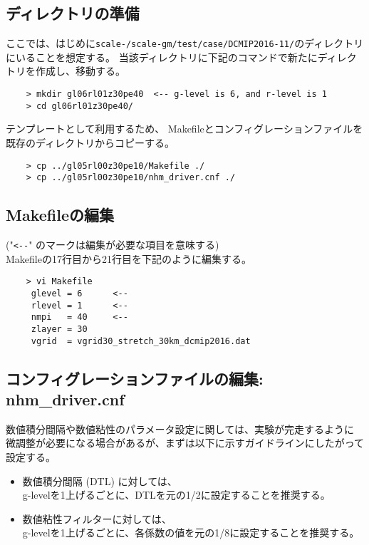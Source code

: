 \subsection{ディレクトリの準備}
 ここでは、はじめに\texttt{scale-{\version}/scale-gm/test/case/DCMIP2016-11/}のディレクトリにいることを想定する。
当該ディレクトリに下記のコマンドで新たにディレクトリを作成し、移動する。
 \begin{verbatim}
    > mkdir gl06rl01z30pe40  <-- g-level is 6, and r-level is 1
    > cd gl06rl01z30pe40/
 \end{verbatim}

 \noindent テンプレートとして利用するため、
  Makefileとコンフィグレーションファイルを既存のディレクトリからコピーする。
 \begin{verbatim}
    > cp ../gl05rl00z30pe10/Makefile ./
    > cp ../gl05rl00z30pe10/nhm_driver.cnf ./
 \end{verbatim}

\subsection{Makefileの編集}
 ("\verb|<--|" のマークは編集が必要な項目を意味する) \\
 Makefileの17行目から21行目を下記のように編集する。
 \begin{verbatim}
    > vi Makefile
     glevel = 6      <--
     rlevel = 1      <--
     nmpi   = 40     <--
     zlayer = 30
     vgrid  = vgrid30_stretch_30km_dcmip2016.dat
 \end{verbatim}

\subsection{コンフィグレーションファイルの編集: nhm\_driver.cnf}
 \noindent 数値積分間隔や数値粘性のパラメータ設定に関しては、実験が完走するように
 微調整が必要になる場合があるが、まずは以下に示すガイドラインにしたがって設定する。

 \begin{itemize}
   \item 数値積分間隔 (DTL) に対しては、 \\
   {\sf g-levelを1上げるごとに、DTLを元の1/2に設定することを推奨する}。
   \item 数値粘性フィルターに対しては、 \\
   {\sf g-levelを1上げるごとに、各係数の値を元の1/8に設定することを推奨する}。 \\
 \end{itemize}

